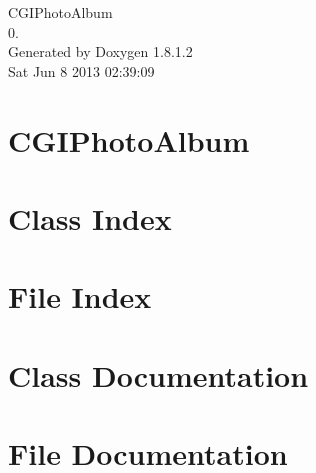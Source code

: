 \documentclass{book}
\begin{document}
\hypersetup{pageanchor=false,citecolor=blue}
\begin{titlepage}
\vspace*{7cm}
\begin{center}
{\Large C\-G\-I\-Photo\-Album \\[1ex]\large 0. }\\
\vspace*{1cm}
{\large Generated by Doxygen 1.8.1.2}\\
\vspace*{0.5cm}
{\small Sat Jun 8 2013 02:39:09}\\
\end{center}
\end{titlepage}
\clearemptydoublepage
{}
\tableofcontents
\clearemptydoublepage
{}
\hypersetup{pageanchor=true,citecolor=blue}
\chapter{C\-G\-I\-Photo\-Album}
\label{md_README}
\hypertarget{md_README}{}

\chapter{Class Index}

\chapter{File Index}

\chapter{Class Documentation}



\chapter{File Documentation}









\printindex
\end{document}
